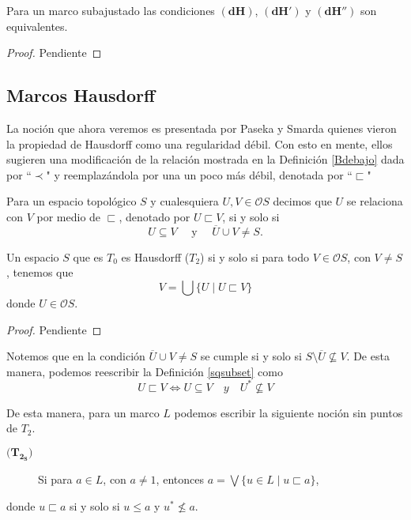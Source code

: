 \documentclass{comunicaciones}
\begin{document}
\begin{prop}\label{Proposicion2.3.1}
    Para un marco subajustado las condiciones $\mathbf{(dH)}$, $\mathbf{(dH')}$ y $\mathbf{(dH'')}$ son equivalentes.
\end{prop}

\begin{proof}
    Pendiente
\end{proof}

\subsection{Marcos Hausdorff}

La noción que ahora veremos es presentada por Paseka y Smarda quienes vieron la propiedad de Hausdorff como una regularidad débil. Con esto en mente, ellos sugieren una modificación de la relación mostrada en la Definición \ref{Bdebajo} dada por ``$\prec$" y reemplazándola por una un poco más débil, denotada por ``$\sqsubset$" 

\begin{dfn}\label{sqsubset}
    Para un espacio topológico $S$ y cualesquiera $U, V\in \mathcal{O}S$ decimos que $U$ se relaciona con $V$ por medio de $\sqsubset$, denotado por $U\sqsubset V$, si y solo si 
    \[
    U\subseteq V\quad\mbox{ y }\quad \overline{U}\cup V\neq S.
    \]
\end{dfn}

\begin{prop}\label{Proposicion3.2}
    Un espacio $S$ que es $T_0$ es Hausdorff ($T_2$) si y solo si para todo $V\in \mathcal{O}S$, con $V\neq S$, tenemos que 
    \[
    V=\bigcup\{U\mid U\sqsubset V\}
    \]
    donde $U\in \mathcal{O}S$.
\end{prop}

\begin{proof}
    Pendiente
\end{proof}

Notemos que en la condición $\overline{U}\cup V\neq S$ se cumple si y solo si $S\setminus \overline{U}\nsubseteq V$. De esta manera, podemos reescribir la Definición \ref{sqsubset} como 
\[
U\sqsubset V\Leftrightarrow U\subseteq V\quad{ y }\quad U^*\nsubseteq V
\]

De esta manera, para un marco $L$ podemos escribir la siguiente noción sin puntos de $T_2$.
\begin{description}
    \item[$\mathbf{(T_{2_S}})$] Si para $a\in L$, con $a\neq 1$, entonces $a=\bigvee\{u\in L\mid u\sqsubset a\}$, 
\end{description}
donde $u\sqsubset a$ si y solo si $u\leq a$ y $u^*\nleq a$.\\
\end{document}
